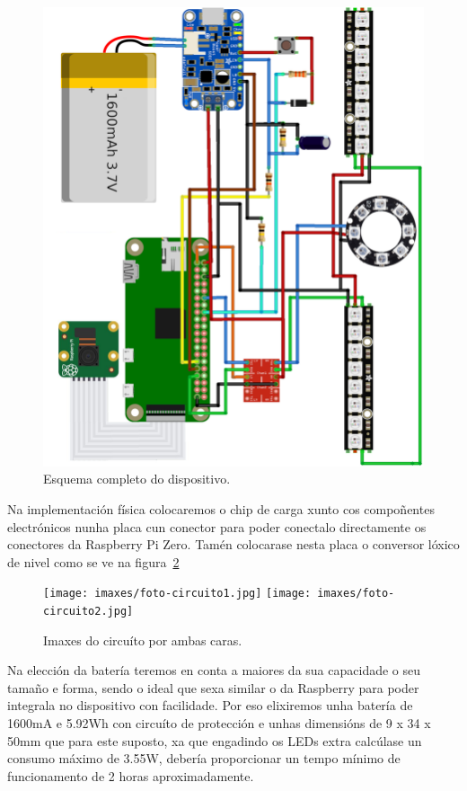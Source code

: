 \begin{itemize}
    \begin{figure}[tbp]
      \centering
    	\includegraphics[scale=1]{imaxes/esquema-completo.png}
    	\caption{Esquema completo do dispositivo.}
    	\label{fig:esquema_dispositivo}
    \end{figure}

    Na implementación física colocaremos o chip de carga xunto cos compoñentes electrónicos nunha placa cun conector para poder conectalo directamente os conectores da Raspberry Pi Zero. Tamén colocarase nesta placa o conversor lóxico de nivel como se ve na figura~\ref{fig:fotos_reverso}

    \begin{figure}[tbp]
      \centering
    	\texttt{[image: imaxes/foto-circuito1.jpg]}
    	\texttt{[image: imaxes/foto-circuito2.jpg]}
    	\caption{Imaxes do circuíto por ambas caras.}
    	\label{fig:fotos_reverso}
    \end{figure}

    Na elección da batería teremos en conta a maiores da sua capacidade o seu tamaño e forma, sendo o ideal que sexa similar o da Raspberry para poder integrala no dispositivo con facilidade. Por eso elixiremos unha batería de 1600mA e 5.92Wh con circuíto de protección e unhas dimensións de 9 x 34 x 50mm que para este suposto, xa que engadindo os LEDs extra calcúlase un consumo máximo de 3.55W, debería proporcionar un tempo mínimo de funcionamento de 2 horas aproximadamente.

\end{itemize}

